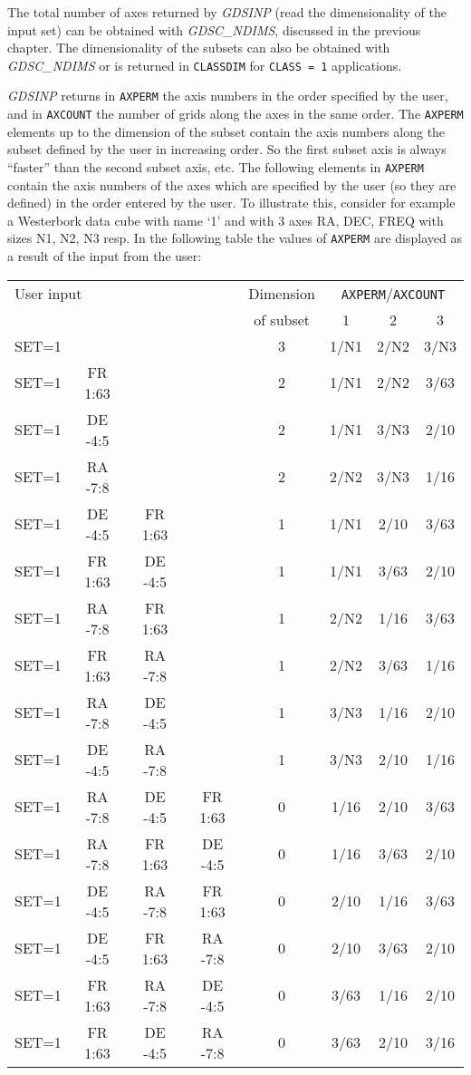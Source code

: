 The total number of axes returned by {\sl GDSINP\/} (read the
dimensionality of the input set) can be obtained with {\sl
GDSC\_NDIMS\/}, discussed in the previous chapter.  The dimensionality
of the subsets can also be obtained with {\sl GDSC\_NDIMS\/} or is
returned in {\tt CLASSDIM} for {\tt CLASS = 1} applications.

{\sl GDSINP\/} returns in {\tt AXPERM} the axis numbers in the order
specified by the user, and in {\tt AXCOUNT} the number of grids along
the axes in the same order.  The {\tt AXPERM} elements up to the
dimension of the subset contain the axis numbers along the subset
defined by the user in increasing order.  So the first subset axis is
always ``faster'' than the second subset axis, etc.  The following
elements in {\tt AXPERM} contain the axis numbers of the axes which are
specified by the user (so they are defined) in the order entered by the
user.  To illustrate this, consider for example a Westerbork data cube
with name `1' and with 3 axes RA, DEC, FREQ with sizes N1, N2, N3 resp.
In the following table the values of {\tt AXPERM} are displayed as a
result of the input from the user:

\begin{center}
\begin{tabular}{|l c c c|c|c|c|c|}
\hline
\multicolumn{4}{|l|}{User input}&Dimension&\multicolumn{3}{|c|}{{\tt AXPERM}/{\tt AXCOUNT}}\\
\multicolumn{4}{|l|}{}&of subset&1&2&3\\
\hline
SET=1&       &       &       &3&1/N1&2/N2&3/N3\\
SET=1&FR 1:63&       &       &2&1/N1&2/N2&3/63\\
SET=1&DE -4:5&       &       &2&1/N1&3/N3&2/10\\
SET=1&RA -7:8&       &       &2&2/N2&3/N3&1/16\\
SET=1&DE -4:5&FR 1:63&       &1&1/N1&2/10&3/63\\
SET=1&FR 1:63&DE -4:5&       &1&1/N1&3/63&2/10\\
SET=1&RA -7:8&FR 1:63&       &1&2/N2&1/16&3/63\\
SET=1&FR 1:63&RA -7:8&       &1&2/N2&3/63&1/16\\
SET=1&RA -7:8&DE -4:5&       &1&3/N3&1/16&2/10\\
SET=1&DE -4:5&RA -7:8&       &1&3/N3&2/10&1/16\\
SET=1&RA -7:8&DE -4:5&FR 1:63&0&1/16&2/10&3/63\\
SET=1&RA -7:8&FR 1:63&DE -4:5&0&1/16&3/63&2/10\\
SET=1&DE -4:5&RA -7:8&FR 1:63&0&2/10&1/16&3/63\\
SET=1&DE -4:5&FR 1:63&RA -7:8&0&2/10&3/63&2/10\\
SET=1&FR 1:63&RA -7:8&DE -4:5&0&3/63&1/16&2/10\\
SET=1&FR 1:63&DE -4:5&RA -7:8&0&3/63&2/10&3/16\\
\hline
\end{tabular}
\end{center}

